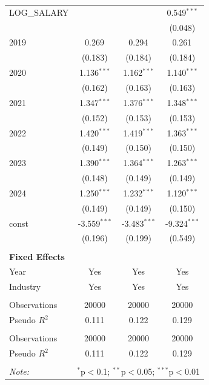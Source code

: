 \begin{table}[!htbp]
\begin{tabular}{@{\extracolsep{5pt}}lccc}
 LOG_SALARY & & & 0.549$^{***}$ \\
& & & (0.048) \\
 2019 & 0.269$^{}$ & 0.294$^{}$ & 0.261$^{}$ \\
& (0.183) & (0.184) & (0.184) \\
 2020 & 1.136$^{***}$ & 1.162$^{***}$ & 1.140$^{***}$ \\
& (0.162) & (0.163) & (0.163) \\
 2021 & 1.347$^{***}$ & 1.376$^{***}$ & 1.348$^{***}$ \\
& (0.152) & (0.153) & (0.153) \\
 2022 & 1.420$^{***}$ & 1.419$^{***}$ & 1.363$^{***}$ \\
& (0.149) & (0.150) & (0.150) \\
 2023 & 1.390$^{***}$ & 1.364$^{***}$ & 1.263$^{***}$ \\
& (0.148) & (0.149) & (0.149) \\
 2024 & 1.250$^{***}$ & 1.232$^{***}$ & 1.120$^{***}$ \\
& (0.149) & (0.149) & (0.150) \\
 const & -3.559$^{***}$ & -3.483$^{***}$ & -9.324$^{***}$ \\
& (0.196) & (0.199) & (0.549) \\
 \hline &  &  &  \\
 \textbf{Fixed Effects} &  &  &  \\
 \quad Year & Yes & Yes & Yes \\
 \quad Industry & Yes & Yes & Yes \\
 \hline &  &  &  \\
 Observations & 20000 & 20000 & 20000 \\
 Pseudo $R^2$ & 0.111 & 0.122 & 0.129 \\
\hline \\[-1.8ex]
 Observations & 20000 & 20000 & 20000 \\
 Pseudo $R^2$ & 0.111 & 0.122 & 0.129 \\
\hline
\hline \\[-1.8ex]
\textit{Note:} & \multicolumn{3}{r}{$^{*}$p$<$0.1; $^{**}$p$<$0.05; $^{***}$p$<$0.01} \\
\end{tabular}
\end{table}